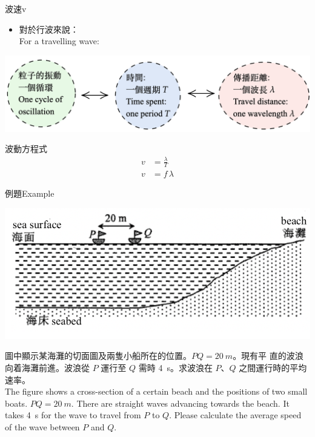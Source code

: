 \documentclass[beamer=true]{standalone}
\begin{document}
\begin{frame}{波速v}
    \begin{itemize}
        \item 對於行波來說：\\For a travelling wave:
    \end{itemize}\bigskip
    \par{\par\centering\includegraphics[width=\textwidth]{./img/ch1_2024-05-08-15-56-03.png}\par}

    \begin{alertblock}{波動方程式}
        \begin{align*}
            v & =\frac{\lambda}{T} \\
            v & =f\,\lambda
        \end{align*}
    \end{alertblock}
\end{frame}

\begin{frame}[t]{例題Example}
    \par{\par\centering\includegraphics[width=.5\textwidth]{./img/ch1_2024-05-09-14-34-58.png}\par}
    圖中顯示某海灘的切面圖及兩隻小船所在的位置。$PQ= \qty{20}{m}$。現有平
    直的波浪向着海灘前進。波浪從 $P$ 運行至 $Q$ 需時 \qty{4}{s}。求波浪在 $P$、$Q$
    之間運行時的平均速率。\\The figure shows a cross-section of a certain beach and the positions of two small boats. $PQ= \qty{20}{m}$. There are straight waves advancing towards the beach. It takes \qty{4}{s} for the wave to travel from $P$ to $Q$. Please calculate the average speed of the wave between $P$ and $Q$.
\end{frame}
\end{document}
